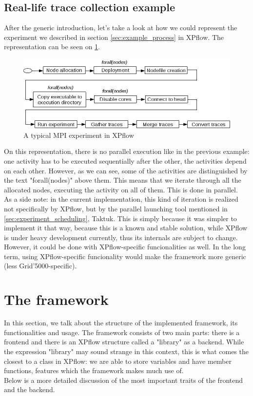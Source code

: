 \subsection{Real-life trace collection example}
After the generic introduction, let's take a look at how we could
represent the experiment we described in section
\ref{sec:example_process} in XPflow. The representation can be seen on
\ref{fig:xpflow_example2}.
\begin{figure}[htbp]
  \centering
    \includegraphics[scale=0.5]{./Figures/xpflow_example2.jpg}
  \caption[dayum]{A typical MPI experiment in XPflow}
  \label{fig:xpflow_example2}
\end{figure}
On this representation, there is no parallel execution like in the
previous example: one activity has to be executed sequentially after
the other, the activities depend on each other. However, as we can
see, some of the activities are distinguished by the text
"forall(nodes)" above them. This means that we iterate through all the
allocated nodes, executing the activity on all of them. This is done
in parallel.\\
As a side note: in the current implementation, this kind of iteration
is realized not
specifically by XPflow, but by the parallel launching tool mentioned
in \ref{sec:experiment_scheduling}, Taktuk\cite{chr09}. This is simply
because it was simpler to implement it that way, because this is a
known and stable solution, while XPflow is under heavy development
currently, thus its internals are subject to change. However, it could
be done with XPflow-specific funcionalities as well. In the long term,
using XPflow-specific funcionality would make the framework more
generic (less Grid'5000-specific).
\section{The framework}
In this section, we talk about the structure of the implemented
framework, its functionalities and usage.
The framework consists of two main parts: there is a frontend and
there is an XPflow structure called a "library" as a backend. While
the expression "library" may sound strange in this context, this is
what comes the closest to a class in XPflow: we are able to store
variables and have member functions, features which the framework
makes much use of.\\
Below is a more detailed discussion of the most important traits of
the frontend and the backend.
